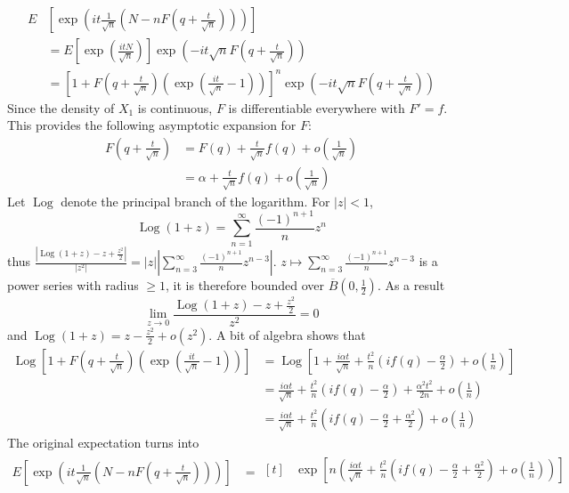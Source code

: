 \documentclass[a4paper,11pt]{article}
\DeclareMathOperator*{\Log}{Log}
\begin{document}
\begin{enumerate}
\begin{enumerate}
$$\begin{aligned}
      E&\left[\exp\left(it\frac{1}{\sqrt{n}}\left(N-n F\left(q+\frac t{\sqrt{n}}\right)\right)\right)\right]\\ 
      &= E\left[\exp\left(\frac{itN}{\sqrt n} \right) \right] \exp\left(-it\sqrt n F\left(q+\frac t{\sqrt{n}}\right) \right)\\
      &= \left[1+F\left(q+\frac t{\sqrt{n}}\right)\left(\exp\left(\frac{it}{\sqrt n}-1 \right) \right) \right]^n \exp\left(-it\sqrt n F\left(q+\frac t{\sqrt{n}}\right) \right)
    \end{aligned}$$
    Since the density of $X_1$ is continuous, $F$ is differentiable everywhere with $F'=f$. This provides the following asymptotic expansion for $F$:
    $$\begin{aligned}
      F\left(q+\frac t{\sqrt{n}}\right) &= F(q) + \frac t{\sqrt{n}} f(q) + o\left(\frac 1{\sqrt{n}} \right)\\
      &= \alpha + \frac t{\sqrt{n}} f(q) + o\left(\frac 1{\sqrt{n}} \right)
    \end{aligned}$$
    Let $\Log$ denote the principal branch of the logarithm. For $|z|<1$, $$\Log(1+z) = \sum_{n=1}^\infty \frac{(-1)^{n+1}}{n}z^n$$
    thus $\displaystyle \frac{|\Log(1+z)-z+\frac{z^2}2|}{|z^2|} = |z|\left|\sum_{n=3}^\infty \frac{(-1)^{n+1}}{n}z^{n-3}\right|$. $\displaystyle z\mapsto \sum_{n=3}^\infty \frac{(-1)^{n+1}}{n}z^{n-3}$ is a power series with radius $\geq 1$, it is therefore bounded over $\overline B(0,\frac 12)$. As a result $$\lim_{z\to 0} \frac{\Log(1+z)-z+\frac{z^2}2}{z^2} = 0$$
    and $\Log(1+z) = z-\frac{z^2}2 + o(z^2)$. A bit of algebra shows that 
    $$\begin{aligned}
    \Log \left[1+F\left(q+\frac t{\sqrt{n}}\right)\left(\exp\left(\frac{it}{\sqrt n}-1 \right) \right) \right] &= \Log[1 + \frac{i\alpha t}{\sqrt n} + \frac{t^2}n \left(if(q)-\frac \alpha 2\right) + o\left(\frac 1n \right)]\\
    &=\frac{i\alpha t}{\sqrt n} + \frac{t^2}n \left(if(q)-\frac \alpha 2\right) +\frac{\alpha^2 t^2}{2n} + o\left(\frac 1n \right)\\
    &=\frac{i\alpha t}{\sqrt n} + \frac{t^2}n \left(if(q)-\frac \alpha 2+\frac {\alpha^2} 2\right) + o\left(\frac 1n \right)
    \end{aligned}
    $$
    The original expectation turns into
    $$\begin{aligned}
    E\left[\exp\left(it\frac{1}{\sqrt{n}}\left(N-n F\left(q+\frac t{\sqrt{n}}\right)\right)\right)\right] &= \begin{aligned}[t]
    &\exp\left[n\left(\frac{i\alpha t}{\sqrt n} + \frac{t^2}n \left(if(q)-\frac \alpha 2+\frac {\alpha^2} 2\right) + o\left(\frac 1n \right) \right)\right]\\

\end{aligned}
\end{aligned}$$
\end{enumerate}
\end{enumerate}
\end{document}
